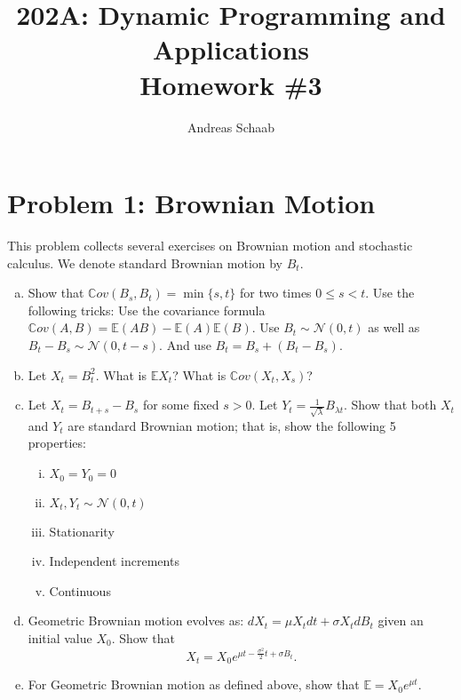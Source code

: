 \documentclass[11pt]{extarticle}
\title{202A: Dynamic Programming and Applications\\[5pt] {\Large \textbf{Homework \#3}}}
\author{Andreas Schaab}
\date{}
\theoremstyle{plain}
\theoremstyle{definition}
\begin{document}
\maketitle



\section*{Problem 1: Brownian Motion}

This problem collects several exercises on Brownian motion and stochastic calculus. We denote standard Brownian motion by $B_t$.

\begin{enumerate}[(a)]

\item Show that $\mathbb Cov(B_s, B_t) = \min\{s, t\}$ for two times $0 \leq s < t$. Use the following tricks: Use the covariance formula $\mathbb Cov(A, B) = \mathbb E (AB) - \mathbb E(A) \mathbb E(B)$. Use $B_t \sim \mathcal N(0, t)$ as well as $B_t - B_s \sim \mathcal N(0, t-s)$. And use $B_t = B_s + (B_t - B_s)$.


\item Let $X_t = B_t^2$. What is $\mathbb E X_t$? What is $\mathbb Cov (X_t, X_s)$?


\item Let $X_t = B_{t+s} - B_s$ for some fixed $s > 0$. Let $Y_t = \frac{1}{\sqrt \lambda} B_{\lambda t}$. Show that both $X_t$ and $Y_t$ are standard Brownian motion; that is, show the following 5 properties: 
\begin{enumerate}[(i)]
\item $X_0 = Y_0 = 0$ 
\item $X_t, Y_t \sim \mathcal N(0, t)$ 
\item Stationarity
\item Independent increments 
\item Continuous 
\end{enumerate}


\item Geometric Brownian motion evolves as: $dX_t = \mu X_t dt + \sigma X_t dB_t$ given an initial value $X_0$. Show that
\begin{equation*}
	X_t = X_0 e^{\mu t - \frac{\sigma^2}{2} t + \sigma B_t}.
\end{equation*}


\item For Geometric Brownian motion as defined above, show that $\mathbb E = X_0 e^{\mu t}$.


\end{enumerate}
\end{document}
